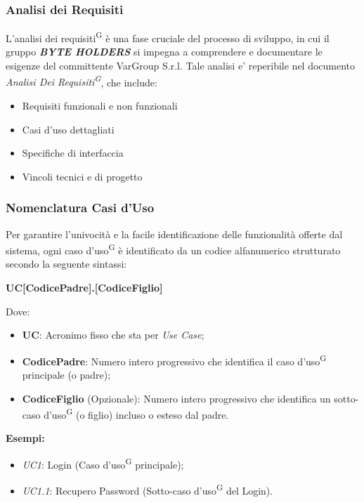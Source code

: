 \documentclass[a4paper, 11pt]{article}
\begin{document}
\subsubsection{Analisi dei Requisiti}
L'analisi dei requisiti\textsuperscript{G} è una fase cruciale del processo di sviluppo, in cui il gruppo \textbf{\textit{BYTE HOLDERS}} si impegna a comprendere e documentare le esigenze del committente VarGroup S.r.l.
Tale analisi e' reperibile nel documento \textit{Analisi Dei Requisiti\textsuperscript{G}}, che include:
\begin{itemize}
    \item Requisiti funzionali e non funzionali
    \item Casi d'uso dettagliati
    \item Specifiche di interfaccia
    \item Vincoli tecnici e di progetto
\end{itemize}
\subsubsection{Nomenclatura Casi d'Uso}
Per garantire l'univocità e la facile identificazione delle funzionalità offerte dal sistema, ogni caso d'uso\textsuperscript{G} è identificato da un codice alfanumerico strutturato secondo la seguente sintassi:

\begin{center}
    \textbf{UC[CodicePadre].[CodiceFiglio]}
\end{center}

Dove:
\begin{itemize}
    \item \textbf{UC}: Acronimo fisso che sta per \textit{Use Case};
    \item \textbf{CodicePadre}: Numero intero progressivo che identifica il caso d'uso\textsuperscript{G} principale (o padre);
    \item \textbf{CodiceFiglio} (Opzionale): Numero intero progressivo che identifica un sotto-caso d'uso\textsuperscript{G} (o figlio) incluso o esteso dal padre.
\end{itemize}

\textbf{Esempi:}
\begin{itemize}
    \item \textit{UC1}: Login (Caso d'uso\textsuperscript{G} principale);
    \item \textit{UC1.1}: Recupero Password (Sotto-caso d'uso\textsuperscript{G} del Login).
\end{itemize}
\end{document}
